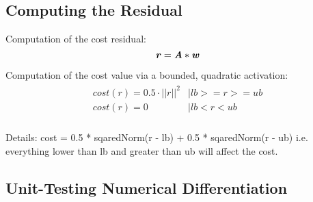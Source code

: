 \subsection{Computing the Residual}
Computation of the cost residual: 
\begin{equation}
\bm{\mathit{r}} = \bm{\mathit{A}} * \bm{\mathit{w}}
\end{equation}

Computation of the cost value via a bounded, quadratic activation:
\begin{align}
\begin{split}
cost(r) = 0.5 \cdot ||r||^2 &\mid lb >= r >= ub \\
cost(r) = 0 &\mid lb < r < ub \\
\end{split}
\end{align}

Details: 
cost = 0.5 * sqaredNorm(r - lb) + 0.5 * sqaredNorm(r - ub) 
i.e. everything lower than lb and greater than ub will affect the cost. 

\subsection{Unit-Testing Numerical Differentiation} 






